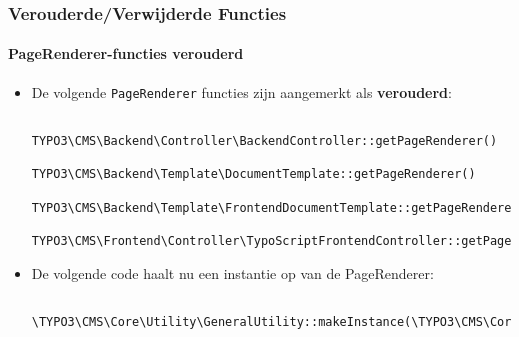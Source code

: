 
\begin{frame}[fragile]
	\frametitle{Verouderde/Verwijderde Functies}
	\framesubtitle{PageRenderer-functies verouderd}

	\lstset{basicstyle=\tiny\ttfamily}

	\begin{itemize}
		\item De volgende \texttt{PageRenderer} functies zijn aangemerkt als \textbf{verouderd}:

			\begin{lstlisting}
				TYPO3\CMS\Backend\Controller\BackendController::getPageRenderer()
				TYPO3\CMS\Backend\Template\DocumentTemplate::getPageRenderer()
				TYPO3\CMS\Backend\Template\FrontendDocumentTemplate::getPageRenderer()
				TYPO3\CMS\Frontend\Controller\TypoScriptFrontendController::getPageRenderer()
			\end{lstlisting}

		\item De volgende code haalt nu een instantie op van de PageRenderer:

			\begin{lstlisting}
				\TYPO3\CMS\Core\Utility\GeneralUtility::makeInstance(\TYPO3\CMS\Core\Page\PageRenderer::class)
			\end{lstlisting}

	\end{itemize}

\end{frame}


